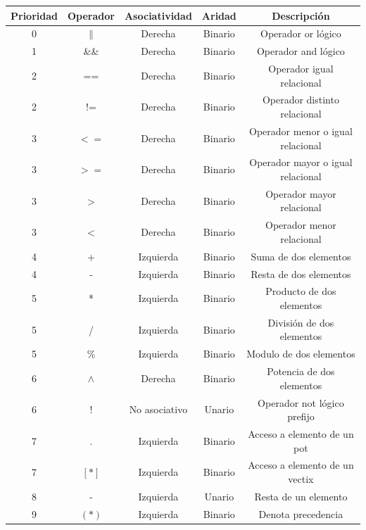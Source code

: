 \documentclass[a4paper, 9pt]{article}
\begin{document}
    \begin{table}[h]
    \begin{center}
    \begin{tabular}{| c | c | c | c | c |}
    \hline
        Prioridad & Operador & Asociatividad & Aridad & Descripción \\ \hline
        0 & $\|$ & Derecha & Binario & Operador or lógico \\ \hline
        1 & \&\& & Derecha & Binario & Operador and lógico \\ \hline
        2 & == & Derecha & Binario & Operador igual relacional \\ \hline
        2 & != & Derecha & Binario & Operador distinto relacional \\ \hline
        3 & $<=$ & Derecha & Binario & Operador menor o igual relacional \\ \hline
        3 & $>=$ & Derecha & Binario & Operador mayor o igual relacional \\ \hline
        3 & $>$ & Derecha & Binario & Operador mayor relacional \\ \hline
        3 & $<$ & Derecha & Binario & Operador menor relacional \\ \hline
        4 & + & Izquierda & Binario & Suma de dos elementos \\ \hline
        4 & - & Izquierda & Binario & Resta de dos elementos \\ \hline
        5 & * & Izquierda & Binario & Producto de dos elementos \\ \hline
        5 & / & Izquierda & Binario & División de dos elementos \\ \hline
        5 & \% & Izquierda & Binario & Modulo de dos elementos \\ \hline
        6 & $\wedge$ & Derecha & Binario & Potencia de dos elementos \\ \hline
        6 & ! & No asociativo & Unario & Operador not lógico prefijo \\ \hline
        7 & . & Izquierda & Binario & Acceso a elemento de un pot \\ \hline
        7 & $[*]$ & Izquierda & Binario & Acceso a elemento de un vectix \\ \hline
        8 & - & Izquierda & Unario & Resta de un elemento \\ \hline
        9 & $(*)$ & Izquierda & Binario & Denota precedencia \\ \hline
        

     
    \hline
    \end{tabular}
    \end{center}
    \end{table}
\end{document}

